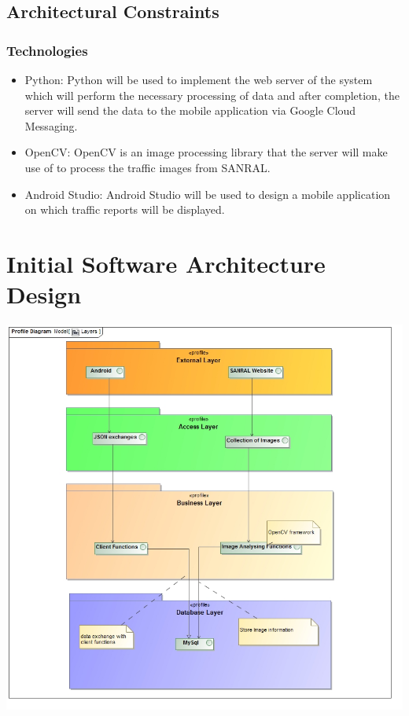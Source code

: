 \documentclass[a4paper,12pt]{article}
\begin{document}
\subsection{Architectural Constraints}
\subsubsection{Technologies}
\begin{itemize}
\item Python: Python will be used to implement the web server of the system which will perform the necessary processing of data and after completion, the server will send the data to the mobile application via Google Cloud Messaging.
\item OpenCV: OpenCV is an image processing library that the server will make use of to process the traffic images from SANRAL.
\item Android Studio: Android Studio will be used to design a mobile application on which traffic reports will be displayed.
\end{itemize}
\section{Initial Software Architecture Design}
\includegraphics[width=\textwidth]{Layers.jpg}
\end{document}

